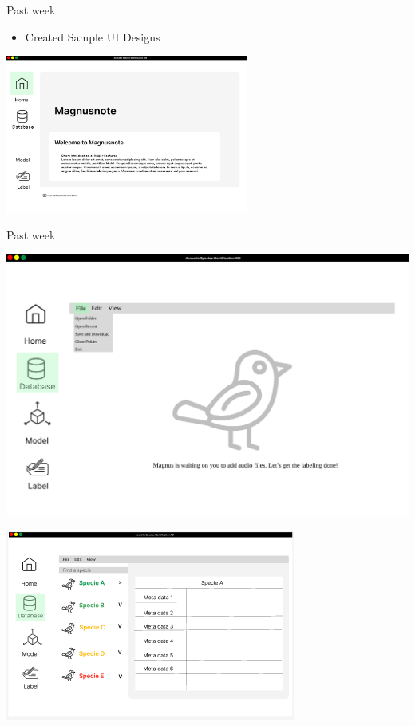 \begin{frame}{Past week} 
    \begin{itemize}
        \item Created Sample UI Designs
    \end{itemize}  
    \centering
    \includegraphics[width=0.6\textwidth]{sampleui1.png}  
\end{frame}

\begin{frame}{Past week} 
    \begin{minipage}[b]{0.45\textwidth}
        \centering
        \includegraphics[width=\textwidth]{sampleui2.png}  
    \end{minipage}
    \hspace{0.05\textwidth}
    \begin{minipage}[b]{0.45\textwidth}
        \centering
        \includegraphics[width=\textwidth]{sampleui5.png} 
    \end{minipage}
\end{frame}


